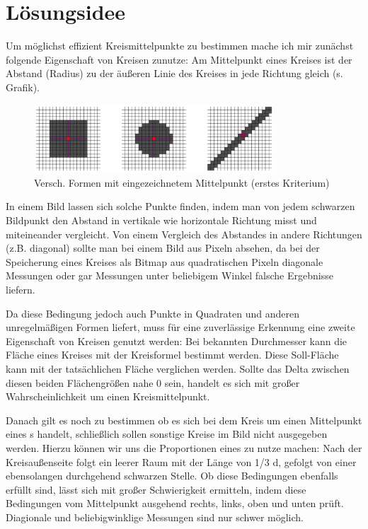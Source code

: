 \section{Lösungsidee}
Um möglichst effizient Kreismittelpunkte zu bestimmen mache ich mir zunächst folgende Eigenschaft von Kreisen zunutze: Am Mittelpunkt eines Kreises ist der Abstand (Radius) zu der äußeren Linie des Kreises in jede Richtung gleich (s. Grafik).

\begin{figure}[!ht]
	\centering	
	\includegraphics[width=0.8\textwidth]{durchmesservergleich}
	\caption{Versch. Formen mit eingezeichnetem Mittelpunkt (erstes Kriterium)}
\end{figure}

In einem Bild lassen sich solche Punkte finden, indem man von jedem schwarzen Bildpunkt den Abstand in vertikale wie horizontale Richtung misst und miteineander vergleicht. Von einem Vergleich des Abstandes in andere Richtungen (z.B. diagonal) sollte man bei einem Bild aus Pixeln absehen, da bei der Speicherung eines Kreises als Bitmap aus quadratischen Pixeln diagonale Messungen oder gar Messungen unter beliebigem Winkel falsche Ergebnisse liefern.

Da diese Bedingung jedoch auch Punkte in Quadraten und anderen unregelmäßigen Formen liefert, muss für eine zuverlässige Erkennung eine zweite Eigenschaft von Kreisen genutzt werden: Bei bekannten Durchmesser kann die Fläche eines Kreises mit der Kreisformel bestimmt werden. Diese Soll-Fläche kann mit der tatsächlichen Fläche verglichen werden. Sollte das Delta zwischen diesen beiden Flächengrößen nahe 0 sein, handelt es sich mit großer Wahrscheinlichkeit um einen Kreismittelpunkt.

Danach gilt es noch zu bestimmen ob es sich bei dem Kreis um einen Mittelpunkt eines \task{}s handelt, schließlich sollen sonstige Kreise im Bild nicht ausgegeben werden. Hierzu können wir uns die Proportionen eines  zu nutze machen: Nach der Kreisaußenseite folgt ein leerer Raum mit der Länge von 1/3 d, gefolgt von einer ebensolangen durchgehend schwarzen Stelle. Ob diese Bedingungen ebenfalls erfüllt sind, lässt sich mit großer Schwierigkeit ermitteln, indem diese Bedingungen vom Mittelpunkt ausgehend rechts, links, oben und unten prüft. Diagionale und beliebigwinklige Messungen sind nur schwer möglich.

